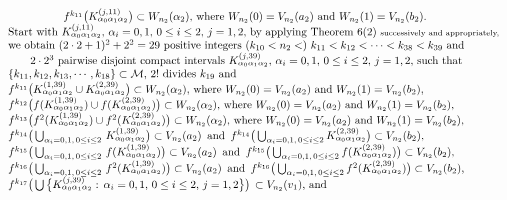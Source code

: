 \documentclass[12pt]{article}
\newcommand{\al}{\alpha}
\begin{document}
{\[\begin{array}{l}
\textrm{\qquad\qquad\quad $f^{k_{11}}\big(K_{\al_0\al_1\al_2}^{(j,11)}\big) \subset W_{n_2}(\al_2)$, where $W_{n_2}(0) = V_{n_2}(a_2)$ and $W_{n_2}(1) = V_{n_2}(b_2)$.}\\
\textrm{Start with $K_{\al_0\al_1\al_2}^{(j,11)}$, $\al_i=0, 1$, $0 \le i \le 2$, $j = 1, 2$, by applying Theorem 6(2) \scriptsize{successively and appropriately,}}\\
\textrm{we obtain $(2 \cdot 2+1)^2 +2^2= 29$ positive integers $(k_{10} < n_2 <)$ $k_{11} < k_{12} < \cdots < k_{38} < k_{39}$ and}\\
\textrm{\quad\quad $2 \cdot 2^3$ pairwise disjoint compact intervals $K_{\al_0\al_1\al_2}^{(j,39)}$, $\al_i= 0, 1$, $0 \le i \le 2$, $j =1,2$, such that}\\
\textrm{$\{ k_{11}, k_{12}, k_{13}, \cdots, k_{18}  \} \subset \mathcal M$, $2!$ divides $k_{19}$ and} \\
\textrm{$f^{k_{11}}\big(K_{\al_0\al_1\al_2}^{(1,39)} \cup K_{\al_0\al_1\al_2}^{(2,39)}\big) \subset W_{n_2}(\al_2)$, where $W_{n_2}(0) = V_{n_2}(a_2)$ and $W_{n_2}(1) = V_{n_2}(b_2)$,}\\
\textrm{$f^{k_{12}}\big(f(K_{\al_0\al_1\al_2}^{(1,39)}) \cup f(K_{\al_0\al_1\al_2}^{(2,39)})\big) \subset W_{n_2}(\al_2)$, where $W_{n_2}(0) = V_{n_2}(a_2)$ and $W_{n_2}(1) = V_{n_2}(b_2)$,}\\
\textrm{$f^{k_{13}}\big(f^2(K_{\al_0\al_1\al_2}^{(1,39)}) \cup f^2(K_{\al_0\al_1\al_2}^{(2,39)})\big) \subset W_{n_2}(\al_2)$, where $W_{n_2}(0) = V_{n_2}(a_2)$ and $W_{n_2}(1) = V_{n_2}(b_2)$,}\\
\textrm{$f^{k_{14}}\big(\bigcup_{\al_i = 0, 1, \, 0 \le i \le 2} \, K_{\al_0\al_1\al_2}^{(1,39)}\big) \subset V_{n_2}(a_2) \,\,\, \text{and} \,\,\, f^{k_{14}}\big(\bigcup_{\al_i = 0, 1, \, 0 \le i \le 2} K_{\al_0\al_1\al_2}^{(2,39)}\big) \subset V_{n_2}(b_2)$,}\\
\textrm{$f^{k_{15}}\big(\bigcup_{\al_i = 0, 1, \, 0 \le i \le 2} \, f(K_{\al_0\al_1\al_2}^{(1,39)})\big) \subset V_{n_2}(a_2) \,\,\, \text{and} \,\,\, f^{k_{15}}\big(\bigcup_{\al_i = 0, 1, \, 0 \le i \le 2} f(K_{\al_0\al_1\al_2}^{(2,39)})\big) \subset V_{n_2}(b_2)$,}\\
\textrm{$f^{k_{16}}\big(\bigcup_{\al_i = 0, 1, \, 0 \le i \le 2} \, f^2(K_{\al_0\al_1\al_2}^{(1,39)})\big) \subset V_{n_2}(a_2) \,\,\, \text{and} \,\,\, f^{k_{16}}\big(\bigcup_{\al_i = 0, 1, \, 0 \le i \le 2} f^2(K_{\al_0\al_1\al_2}^{(2,39)})\big) \subset V_{n_2}(b_2)$,}\\
\textrm{$f^{k_{17}}\big(\bigcup \big\{ K_{\al_0\al_1\al_2}^{(j,39)}: \, \al_i = 0, 1, \, 0 \le i \le 2, \, j = 1, 2 \big\}\big) \, \subset V_{n_2}(v_1)$, and}\\

\end{array}\]}
\end{document}
